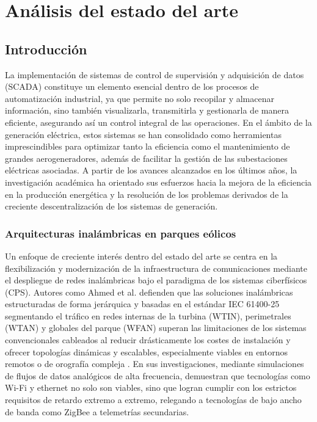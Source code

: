 \chapter{Análisis del estado del arte}
\label{cap:estado_del_arte}


 


\section{Introducción}

\par
La implementación de sistemas de control de supervisión y adquisición de datos (\ac{SCADA}) constituye un elemento esencial dentro de los procesos de automatización industrial, ya que permite no solo recopilar y almacenar información, sino también visualizarla, transmitirla y gestionarla de manera eficiente, asegurando así un control integral de las operaciones. En el ámbito de la generación eléctrica, estos sistemas se han consolidado como herramientas imprescindibles para optimizar tanto la eficiencia como el mantenimiento de grandes aerogeneradores, además de facilitar la gestión de las subestaciones eléctricas asociadas. A partir de los avances alcanzados en los últimos años, la investigación académica ha orientado sus esfuerzos hacia la mejora de la eficiencia en la producción energética y la resolución de los problemas derivados de la creciente descentralización de los sistemas de generación.\par


\subsection{Arquitecturas inalámbricas en parques eólicos}
Un enfoque de creciente interés dentro del estado del arte se centra en la flexibilización y modernización de la infraestructura de comunicaciones mediante el despliegue de redes inalámbricas bajo el paradigma de los sistemas ciberfísicos (CPS). Autores como Ahmed et al. \cite{Ahmed2020} \cite{ahmed2014communication} defienden que las soluciones inalámbricas estructuradas de forma jerárquica y basadas en el estándar IEC 61400-25 segmentando el tráfico en redes internas de la turbina (WTIN), perimetrales (WTAN) y globales del parque (WFAN) superan las limitaciones de los sistemas convencionales cableados al reducir drásticamente los costes de instalación y ofrecer topologías dinámicas y escalables, especialmente viables en entornos remotos o de orografía compleja \cite{gungor2009industrial}. En sus investigaciones, mediante simulaciones de flujos de datos analógicos de alta frecuencia, demuestran que tecnologías como Wi-Fi y ethernet no solo son viables, sino que logran cumplir con los estrictos requisitos de retardo extremo a extremo, relegando a tecnologías de bajo ancho de banda como ZigBee a telemetrías secundarias\cite{mahmood2015review}.\par  

